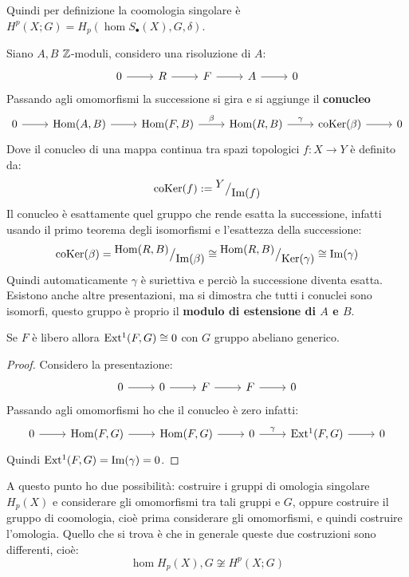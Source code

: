 Quindi per definizione la coomologia singolare è $ H^p(X;G) = H_p(\hom{S_\bullet(X), G}, \delta) $.
\begin{definition}
  Siano $ A, B $ $ \mathbb{Z} $-moduli, considero una risoluzione di $ A $:
  \[
    \begin{tikzcd}
      0 \rar & R \rar & F \rar & A \rar & 0
    \end{tikzcd}
  \]
  Passando agli omomorfismi la successione si gira e si aggiunge il \textbf{conucleo}
  \[
    \begin{tikzcd}
      0 \rar & \hom{A,B} \rar & \hom{F,B} \rar{\beta} & \hom{R,B} \rar{\gamma} & \coker{\beta} \rar & 0
    \end{tikzcd}
  \]
  Dove il conucleo di una mappa continua tra spazi topologici $ f \colon X \to Y $ è definito
  da:
  \[
    \mathrm{coKer}( f) := {^{\textstyle Y}\big/_{\textstyle \mathrm{Im}( f )}}
  \]
  Il conucleo è esattamente quel gruppo che rende esatta la successione, infatti
  usando il primo teorema degli isomorfismi e l'esattezza della successione:
  \[
    \mathrm{coKer}( \beta) = {^{\textstyle \mathrm{Hom}( R,B)}\big/_{\textstyle \mathrm{Im}( \beta )}} \cong {^{\textstyle \mathrm{Hom}( R,B)}\big/_{\textstyle \mathrm{Ker}( \gamma)}} \cong \mathrm{Im}( \gamma )
  \]
  Quindi automaticamente $ \gamma $ è suriettiva e perciò la successione diventa esatta.
  Esistono anche altre presentazioni, ma si dimostra che tutti i conuclei sono isomorfi,
  questo gruppo è proprio il \textbf{modulo di estensione di $ A $ e $ B $}.
\end{definition}
\begin{lemma}
  Se $ F $ è libero allora $ \mathrm{Ext^1}( F, G) \cong 0 $ con $ G $ gruppo abeliano generico.
\end{lemma}
\begin{proof}
  Considero la presentazione:
  \[
    \begin{tikzcd}
      0 \rar & 0 \rar & F \rar & F \rar & 0
    \end{tikzcd}
  \]
  Passando agli omomorfismi ho che il conucleo è zero infatti:
  \[
    \begin{tikzcd}
      0 \rar & \hom{F,G} \rar & \hom{F,G} \rar & 0 \rar{\gamma} & \ext{F,G} \rar & 0
    \end{tikzcd}
  \]
  Quindi $ \mathrm{Ext^1}( F,G) = \mathrm{Im}( \gamma ) = 0 $.
\end{proof}
\eproof
A questo punto ho due possibilità: costruire i gruppi di omologia singolare
$ H_p(X) $ e considerare gli omomorfismi tra tali gruppi e $ G $, oppure
costruire il gruppo di coomologia, cioè prima considerare gli omomorfismi, e
quindi costruire l'omologia. Quello che si trova è che in generale queste
due costruzioni sono differenti, cioè:
\[
  \hom{H_p(X), G} \not \cong H^p(X ; G)
\]

